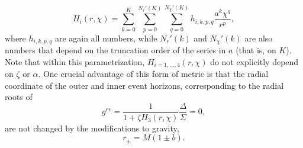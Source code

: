 \documentclass[aps,prx,amsmath,floats,floatfix,twocolumn,
  superscriptaddress,nofootinbib,showpacs]{revtex4-1}
\begin{document}
\begin{equation}\label{eq:H_fns}
H_i (r, \chi) = \sum_{k=0}^{K} \sum_{p=0}^{N_{r}'(K)} \sum_{q=0}^{N_{\chi}'(K)} h_{i, k, p, q} \frac{a^{k} \chi^{q} }{r^p}, 
\end{equation}
where $h_{i, k, p, q}$ are again all numbers, while  $N_{r}'(k)$ and $N_{\chi}'(k)$ 
are also numbers that depend on the truncation order of the series in $a$ (that is, on $K$). 
Note that within this parametrization, $H_{i=1, ..., 4}(r, \chi)$ do not explicitly depend on $\zeta$ or $\alpha$. 
One crucial advantage of this form of metric is that the radial coordinate of the outer and inner event horizons, corresponding to the radial roots of 
\begin{equation}
g^{rr} = \frac{1}{1+\zeta H_3 (r, \chi)}\frac{\Delta}{\Sigma} = 0, 
\end{equation}
are not changed by the modifications to gravity, 
\begin{equation}
r_{\pm} = M\left( 1 \pm b \right). 
\end{equation}
\end{document}
